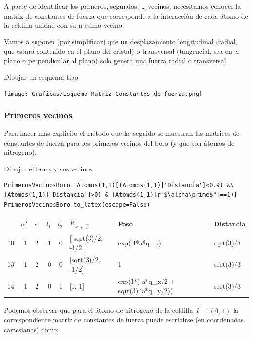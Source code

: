 \documentclass[12pt,a4paper]{article}
\begin{document}
A parte de identificar los primeros, segundos, \ldots{} vecinos, necesitamos conocer la matriz de constantes de fuerza que corresponde a la interacción de cada átomo de la celdilla unidad con su n-esimo vecino.

Vamos a suponer (por simplificar) que un desplazamiento longitudinal (radial, que estará contenido en el plano del cristal) o transversal (tangencial, sea en el plano o perpendicular al plano) solo genera una fuerza radial o transversal.

\color{red}
Dibujar un esquema tipo
\begin{center}
\texttt{[image: Graficas/Esquema\_Matriz\_Constantes\_de\_fuerza.png]}
\end{center}
\normalcolor
\subsubsection{Primeros vecinos}
\label{sec:org6f9128f}
Para hacer más explicito el método que he seguido se muestran las matrices de constantes de fuerza para los primeros vecinos del boro (y que son átomos de nitrógeno).

\color{red} 
Dibujar el boro, y sus vecinos 
\normalcolor

\begin{verbatim}
PrimerosVecinosBoro= Atomos(1,1)[(Atomos(1,1)['Distancia']<0.9) &\
(Atomos(1,1)['Distancia']>0) & (Atomos(1,1)[r"$\alpha\prime$"]==1)]
PrimerosVecinosBoro.to_latex(escape=False)
\end{verbatim}

\begin{tabular}{lrrrrlll}
\toprule
{} &  $\alpha\prime$ &  $\alpha$ &  $l_1$ &  $l_2$ & $\hat R_{\nu\prime,\nu,\vec l}$ &                                 Fase &  Distancia \\
\midrule
10 &               1 &         2 &     -1 &      0 &              [-sqrt(3)/2, -1/2] &                        exp(-I*a*q_x) &  sqrt(3)/3 \\
13 &               1 &         2 &      0 &      0 &               [sqrt(3)/2, -1/2] &                                    1 &  sqrt(3)/3 \\
14 &               1 &         2 &      0 &      1 &                          [0, 1] &  exp(I*(-a*q_x/2 + sqrt(3)*a*q_y/2)) &  sqrt(3)/3 \\
\bottomrule
\end{tabular}

Podemos observar que para el átomo de nitrogeno de la celdilla \(\vec l = (0,1)\) la correspondiente matriz de constantes de fuerza puede escribirse (en coordenadas cartesianas) como:
\end{document}
